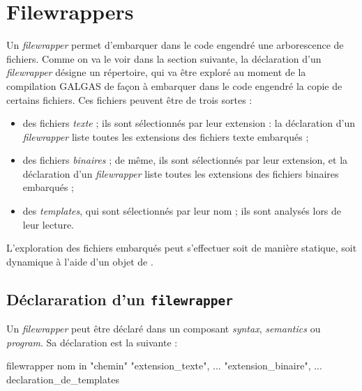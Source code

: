 
\chapter{Filewrappers}

Un \emph{filewrapper} permet d'embarquer dans le code engendré une arborescence de fichiers. Comme on va le voir dans la section suivante, la déclaration d'un \emph{filewrapper} désigne un répertoire, qui va être exploré au moment de la compilation GALGAS de façon à embarquer dans le code engendré la copie de certains fichiers. Ces  fichiers peuvent être de trois sortes :
\begin{itemize}
  \item des fichiers \emph{texte} ; ils sont sélectionnés par leur extension : la déclaration d'un \emph{filewrapper} liste toutes les extensions des fichiers texte embarqués ;
  \item des fichiers \emph{binaires} ; de même, ils sont sélectionnés par leur extension, et la déclaration d'un \emph{filewrapper} liste toutes les extensions des fichiers binaires embarqués ;
  \item des \emph{templates}, qui sont sélectionnés par leur nom ; ils sont analysés lors de leur lecture.
\end{itemize}


L'exploration des fichiers embarqués peut s'effectuer soit de manière statique, soit dynamique à l'aide d'un objet de .









\section{Déclararation d'un \texttt{filewrapper}}

Un \emph{filewrapper} peut être déclaré dans un composant \emph{syntax}, \emph{semantics} ou \emph{program}. Sa déclaration est la suivante :

\begin{galgascode}
filewrapper nom in "chemin" {
 "extension_texte", ...
}{
 "extension_binaire", ...
}{
 declaration_de_templates
}
\end{galgascode}


